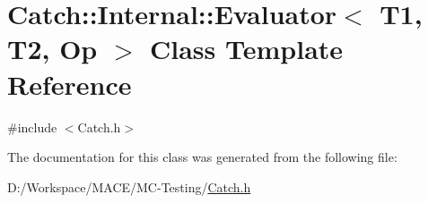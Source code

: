 \hypertarget{class_catch_1_1_internal_1_1_evaluator}{}\section{Catch\+:\+:Internal\+:\+:Evaluator$<$ T1, T2, Op $>$ Class Template Reference}
\label{class_catch_1_1_internal_1_1_evaluator}


{\ttfamily \#include $<$Catch.\+h$>$}



The documentation for this class was generated from the following file\+:\begin{DoxyCompactItemize}
\item 
D\+:/\+Workspace/\+M\+A\+C\+E/\+M\+C-\/\+Testing/\hyperlink{_catch_8h}{Catch.\+h}\end{DoxyCompactItemize}
